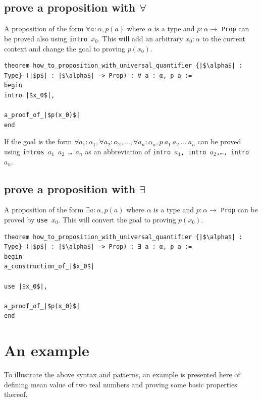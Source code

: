 \documentclass{report}
\theoremstyle{definition}
\begin{document}
\subsection{prove a proposition with $\forall$}\label{lean:forall}
A proposition of the form $\forall a : \alpha, p(a)$ where $\alpha$ is a type and $p : \alpha\to$ {\tt \small Prop} can be proved also using {\tt \small intro $x_0$}. This will add an arbitrary $x_0:\alpha$ to the current context and change the goal to proving $p(x_0)$.

\begin{verbatim}
theorem how_to_proposition_with_universal_quantifier {|$\alpha$| : Type} (|$p$| : |$\alpha$| -> Prop) : ∀ a : α, p a :=
begin
intro |$x_0$|,

a_proof_of_|$p(x_0)$|
end
\end{verbatim}

If the goal is the form $\forall a_1:\alpha_1,\forall a_2:\alpha_2,\dots,\forall a_n:\alpha_n, p\ a_1\ a_2\ \dots\ a_n$ can be proved using {\tt \small intros $a_1$ $a_2$ \dots\  $a_n$} as an abbreviation of {\tt \small intro $a_1$, intro $a_2$,\dots, intro $a_n$}.

\subsection{prove a proposition with $\exists$}\label{lean:exists}
A proposition of the form $\exists a:\alpha, p(a)$ where $\alpha$ is a type and $p : \alpha\to$ {\tt \small Prop}  can be proved by {\tt \small use $x_0$}. This will convert the goal to proving $p(x_0)$.

\begin{verbatim}
theorem how_to_proposition_with_universal_quantifier {|$\alpha$| : Type} (|$p$| : |$\alpha$| -> Prop) : ∃ a : α, p a :=
begin
a_construction_of_|$x_0$|

use |$x_0$|,
  
a_proof_of_|$p(x_0)$|
end
\end{verbatim}

\section{An example}
To illustrate the above syntax and patterns, an example is presented here of defining mean value of two real numbers and proving some basic properties thereof.
\end{document}
